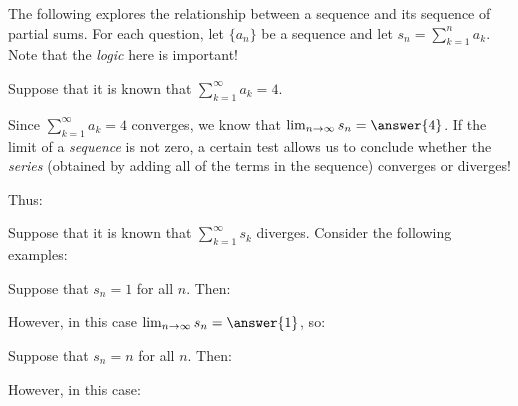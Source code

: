 \documentclass{ximera}
\author{Jim Talamo}
\begin{document}
\begin{exercise}

The following explores the relationship between a sequence and its sequence of partial sums.  For each question, let $\{a_n\}$ be a sequence and let $s_n = \sum_{k=1}^n a_k$.  Note that the \emph{logic} here is important!

Suppose that it is known that $\sum_{k=1}^{\infty} a_k = 4$.  

Since $\sum_{k=1}^{\infty} a_k=4$ converges, we know that $\lim_{n \to \infty} s_n = \answer{4}$.  If the limit of a \emph{sequence} is not zero, a certain test allows us to conclude whether the \emph{series} (obtained by adding all of the terms in the sequence) converges or diverges! 

\begin{exercise}
Thus:
\begin{multipleChoice}
\end{multipleChoice}
\end{exercise}

\begin{exercise}
Suppose that it is known that $\sum_{k=1}^{\infty} s_k$ diverges.  Consider the following examples:

\begin{exercise}
Suppose that $s_n = 1$ for all $n$.  Then:
\begin{multipleChoice}
\end{multipleChoice}
However, in this case $\lim_{n \to \infty} s_n = \answer{1}$, so:
\begin{multipleChoice}
\end{multipleChoice} 

\begin{exercise}
Suppose that $s_n = n$ for all $n$.  Then:
\begin{multipleChoice}
\end{multipleChoice}
However, in this case:


\end{exercise}
\end{exercise}
\end{exercise}
\end{exercise}
\end{document}
